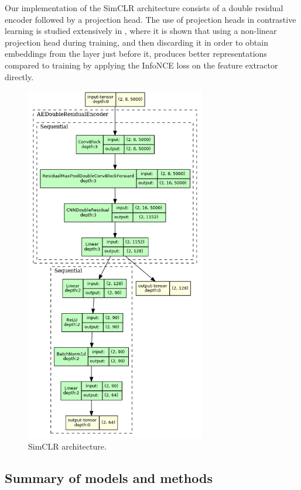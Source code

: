 \documentclass[a4paper,10pt]{article}
\begin{document}
Our implementation of the SimCLR architecture consists of a double residual encoder \cite{doubleresidual} followed by a projection head. The use of projection heads in contrastive learning is studied extensively in \cite{simclrprojection}, where it is shown that using a non-linear projection head during training, and then discarding it in order to obtain embeddings from the layer just before it, produces better representations compared to training by applying the InfoNCE loss on the feature extractor directly.
\begin{figure}[htbp]
	\centering
	\includegraphics[width=0.7\textwidth]{SimCLR.gv.png}
	\caption{SimCLR architecture.}%
	\label{fig:simclr_architecture}
\end{figure}


\subsection{Summary of models and methods}
\end{document}
